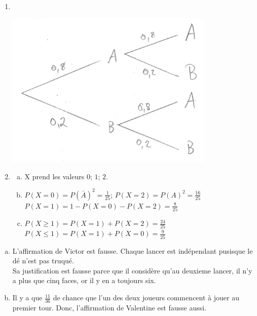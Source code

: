 \documentclass[12pt, a4paper]{article}
\begin{document}
    \begin{Exercise}[number={66}]
      \begin{enumerate}[1.]
        \item \ \\\parbox{\linewidth}{
                    \centering
                    \includegraphics[width=10cm]{VAimg1.jpg}
                  } \bigbreak
        \item \begin{enumerate}[a)]
                \item X prend les valeurs $0$; $1$; $2$.
                \item $P(X=0)=P(\bar{A})^2=\frac{1}{25}$; \quad $P(X=2)=P(A)^2=\frac{16}{25}$ \smallbreak $P(X=1)=1-P(X=0)-P(X=2)=\frac{8}{25}$
                \item $P(X\geq1)=P(X=1)+P(X=2)=\frac{24}{25}$ \smallbreak $P(X\leq1)=P(X=1)+P(X=0)=\frac{9}{25}$
              \end{enumerate}
      \end{enumerate}
    \end{Exercise}

    \begin{Exercise}[number={67}]
      \begin{enumerate}[a)]
        \item L'affirmation de Victor est fausse. Chaque lancer est indépendant pusisque le dé n'est pas truqué. \\ Sa justification est fausse parce que il considère qu'au deuxieme lancer, il n'y a plus que cinq faces, or il y en a toujours six.
        \item Il y a que $\frac{11}{36}$ de chance que l'un des deux joueurs commencent à jouer au premier tour. Donc, l'affirmation de Valentine est fausse aussi.
      \end{enumerate}
    \end{Exercise}
\end{document}

